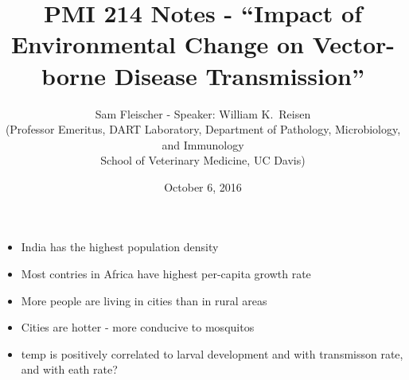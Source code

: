 \documentclass{article}
\title{PMI 214 Notes - ``Impact of Environmental Change on Vector-borne Disease Transmission''}
\author{Sam Fleischer - Speaker: William K.~Reisen\\ (Professor Emeritus, DART Laboratory, Department of Pathology, Microbiology, and Immunology\\ School of Veterinary Medicine, UC Davis)}
\date{October 6, 2016}
\begin{document}
    \maketitle

    \begin{itemize}
        \item India has the highest population density
        \item Most contries in Africa have highest per-capita growth rate
        \item More people are living in cities than in rural areas
        \item Cities are hotter - more conducive to mosquitos
        \item temp is positively correlated to larval development and with transmisson rate, and with eath rate?
    \end{itemize}
\end{document}
